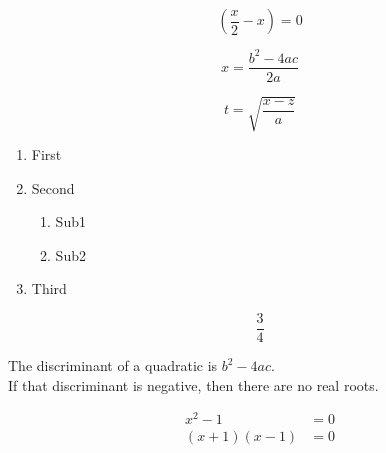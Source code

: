 \documentclass{article}
\begin{document}
$$\left( \frac{x}{2} - x \right) = 0$$

$$x = \frac{b^2-4ac}{2a}$$

$$t = \sqrt{\frac{x-z}{a}}$$

\begin{enumerate}
\item First
\item Second
		\begin{enumerate}
		\item Sub1
		\item Sub2
		\end{enumerate}
\item Third
\end{enumerate}

$$\frac{3}{4}$$

The discriminant of a quadratic is $b^2 - 4ac$. \\
If that discriminant is negative, then there are no real roots.

\begin{align*}
x^2-1 &= 0 \\
(x+1)(x-1) &=0
\end{align*}
\end{document}
